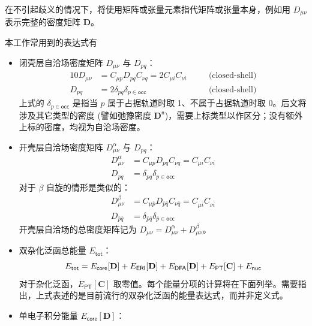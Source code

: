 在不引起歧义的情况下，将使用矩阵或张量元素指代矩阵或张量本身，例如用 $D_{\mu \nu}$ 表示完整的密度矩阵 $\mathbf{D}$。

本工作常用到的表达式有
\begin{itemize}[nosep]
  \item 闭壳层自洽场密度矩阵 $D_{\mu \nu}$ 与 $D_{pq}$：
        \begin{alignat}{10}
          D_{\mu \nu} &= C_{\mu p} D_{pq} C_{\nu q} = 2 C_{\mu i} C_{\nu i} \quad &&\text{(closed-shell)} \\
          D_{pq} &= 2 \delta_{pq} \delta_{p \in \textsf{occ}} \quad &&\text{(closed-shell)}
        \end{alignat}
        上式的 $\delta_{p \in \textsf{occ}}$ 是指当 $p$ 属于占据轨道时取 1、不属于占据轨道时取 0。后文将涉及其它类型的密度 (譬如弛豫密度 $\mathbf{D}^\textsf{n}$)，需要上标类型以作区分；没有额外上标的密度，均视为自洽场密度。
  \item 开壳层自洽场密度矩阵 $D_{\mu \nu}^\alpha$ 与 $D_{pq}$：
        \begin{align}
          D_{\mu \nu}^\alpha &= C_{\mu p} D_{pq} C_{\nu q} = C_{\mu i} C_{\nu i} \\
          D_{pq} &= \delta_{pq} \delta_{p \in \textsf{occ}}
        \end{align}
        对于 $\beta$ 自旋的情形是类似的：
        \begin{align}
          D_{\mu \nu}^\beta &= C_{\mu \bar p} D_{\bar p \bar q} C_{\nu \bar q} = C_{\mu \bar i} C_{\nu \bar i} \\
          D_{\bar p \bar q} &= \delta_{\bar p \bar q} \delta_{\bar p \in \textsf{occ}}
        \end{align}
        开壳层自洽场的总密度矩阵记为 $D_{\mu \nu} = D_{\mu \nu}^\alpha + D_{\mu \nu}^\beta$。
  \item 双杂化泛函总能量 $E_\textsf{tot}$：
        \begin{equation}
          \label{eq.def-E-tot}
          E_\textsf{tot} = E_\textsf{core} [\mathbf{D}] + E_\textsf{ERI} [\mathbf{D}] + E_\textsf{DFA} [\mathbf{D}] + E_\textsf{PT} [\mathbf{C}] + E_\textsf{nuc} \\
        \end{equation}
        对于杂化泛函，$E_\textsf{PT} [\mathbf{C}]$ 取零值。每个能量分项的计算将在下面列举。需要指出，上式表述的是目前流行的双杂化泛函的能量表达式，而并非定义式。
  \item 单电子积分能量 $E_\textsf{core} [\mathbf{D}]$：
        \begin{equation}

\end{equation}
\end{itemize}
